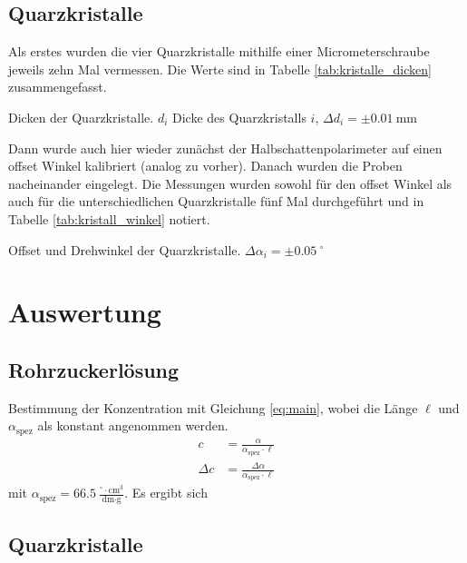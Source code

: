 \documentclass{article}
\newcommand{\as}{\alpha_\text{spez}}
\begin{document}
\subsection{Quarzkristalle}

Als erstes wurden die vier Quarzkristalle mithilfe einer Micrometerschraube jeweils zehn Mal vermessen. Die Werte sind in Tabelle \ref{tab:kristalle_dicken} zusammengefasst.

\begin{table}[H]
\caption{Dicken der Quarzkristalle. $d_i$ Dicke des Quarzkristalls $i$, $\Delta d_i = \pm 0.01~$mm }
\label{tab:kristalle_dicken}
\centering

\end{table}


Dann wurde auch hier wieder zunächst der Halbschattenpolarimeter auf einen offset Winkel kalibriert (analog zu vorher). Danach wurden die Proben nacheinander eingelegt. Die Messungen wurden sowohl für den offset Winkel als auch für die unterschiedlichen Quarzkristalle fünf Mal durchgeführt und in Tabelle \ref{tab:kristall_winkel} notiert.



\begin{table}[H]
\caption{Offset und Drehwinkel der Quarzkristalle. $\Delta\alpha_i = \pm 0.05~^\circ$}
\label{tab:kristall_winkel}
\centering

\end{table}


\section{Auswertung}


\subsection{Rohrzuckerlösung}


Bestimmung der Konzentration mit Gleichung \eqref{eq:main}, wobei die Länge $\ell$ und $\as$ als konstant angenommen werden.
\begin{align*}
c &= \frac{\alpha}{\as\cdot \ell} \\
\Delta c &= \frac{\Delta \alpha}{\as\cdot \ell}
\end{align*}
mit $\as = 66.5~\frac{{}^\circ\cdot \text{cm}^3}{\text{dm}\cdot \text{g}}$. Es ergibt sich



\subsection{Quarzkristalle}
\end{document}
